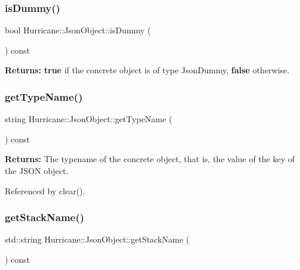 \subsubsection{\texorpdfstring{is\+Dummy()}{isDummy()}}
{\footnotesize\ttfamily bool Hurricane\+::\+Json\+Object\+::is\+Dummy (\begin{DoxyParamCaption}{ }\end{DoxyParamCaption}) const\hspace{0.3cm}{\ttfamily [virtual]}}

{\bfseries Returns\+:} {\bfseries true} if the concrete object is of type {\ttfamily Json\+Dummy}, {\bfseries false} otherwise. \mbox{\label{classHurricane_1_1JsonObject_a947e1c3f8dbae63bb2d086b5b827a2a5}} 
\subsubsection{\texorpdfstring{get\+Type\+Name()}{getTypeName()}}
{\footnotesize\ttfamily string Hurricane\+::\+Json\+Object\+::get\+Type\+Name (\begin{DoxyParamCaption}{ }\end{DoxyParamCaption}) const\hspace{0.3cm}{\ttfamily [pure virtual]}}

{\bfseries Returns\+:} The typename of the concrete object, that is, the value of the {\ttfamily }  key of the J\+S\+ON object. 

Referenced by clear().

\mbox{\label{classHurricane_1_1JsonObject_a34c4e38611238021df8cc69fc32f5e48}} 
\subsubsection{\texorpdfstring{get\+Stack\+Name()}{getStackName()}}
{\footnotesize\ttfamily std\+::string Hurricane\+::\+Json\+Object\+::get\+Stack\+Name (\begin{DoxyParamCaption}{ }\end{DoxyParamCaption}) const\hspace{0.3cm}{\ttfamily [inline]}}

